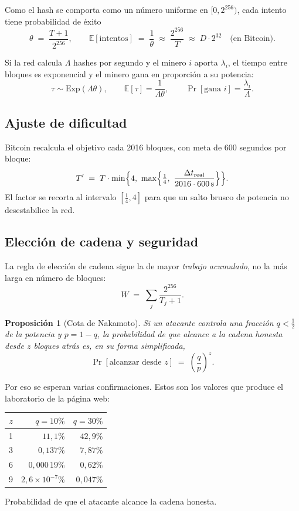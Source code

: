 \documentclass[11pt,a4paper]{article}
\theoremstyle{definition}
\theoremstyle{plain}
\newtheorem{proposicion}{Proposición}
\theoremstyle{remark}
\begin{document}
Como el hash se comporta como un número uniforme en $[0,2^{256})$, cada intento
tiene probabilidad de éxito
\[
  \theta \;=\; \frac{T+1}{2^{256}},
  \qquad
  \mathbb{E}[\text{intentos}] \;=\; \frac{1}{\theta} \;\approx\; \frac{2^{256}}{T}
  \;\approx\; D\cdot 2^{32} \quad\text{(en Bitcoin).}
\]

Si la red calcula $\Lambda$ hashes por segundo y el minero $i$ aporta
$\lambda_i$, el tiempo entre bloques es exponencial y el minero gana en
proporción a su potencia:
\[
  \tau \sim \mathrm{Exp}(\Lambda\theta),
  \qquad \mathbb{E}[\tau] = \frac{1}{\Lambda\theta},
  \qquad \Pr[\text{gana } i] = \frac{\lambda_i}{\Lambda}.
\]

\subsection{Ajuste de dificultad}

Bitcoin recalcula el objetivo cada 2016 bloques, con meta de 600 segundos por
bloque:
\[
  T' \;=\; T \cdot \min\Bigl\{4,\ \max\Bigl\{\tfrac14,\
  \frac{\Delta t_{\text{real}}}{2016\cdot 600\,\mathrm{s}}\Bigr\}\Bigr\}.
\]
El factor se recorta al intervalo $[\frac14, 4]$ para que un salto brusco de
potencia no desestabilice la red.

\subsection{Elección de cadena y seguridad}

La regla de elección de cadena sigue la de mayor \emph{trabajo acumulado}, no la
más larga en número de bloques:
\[
  W \;=\; \sum_j \frac{2^{256}}{T_j + 1}.
\]

\begin{proposicion}[Cota de Nakamoto]
Si un atacante controla una fracción $q < \frac12$ de la potencia y
$p = 1-q$, la probabilidad de que alcance a la cadena honesta desde $z$ bloques
atrás es, en su forma simplificada,
\[
  \Pr[\text{alcanzar desde } z] \;=\; \left(\frac{q}{p}\right)^{z}.
\]
\end{proposicion}

Por eso se esperan varias confirmaciones. Estos son los valores que produce el
laboratorio de la página web:

\begin{center}
\small
\begin{tabular}{@{}rrr@{}}
\toprule
$z$ & $q = 10\%$ & $q = 30\%$ \\
\midrule
1 & $11{,}1\%$      & $42{,}9\%$ \\
3 & $0{,}137\%$     & $7{,}87\%$ \\
6 & $0{,}000\,19\%$ & $0{,}62\%$ \\
9 & $2{,}6\times10^{-7}\%$ & $0{,}047\%$ \\
\bottomrule
\end{tabular}

\vspace{0.4em}
{\footnotesize Probabilidad de que el atacante alcance la cadena honesta.}
\end{center}
\end{document}

